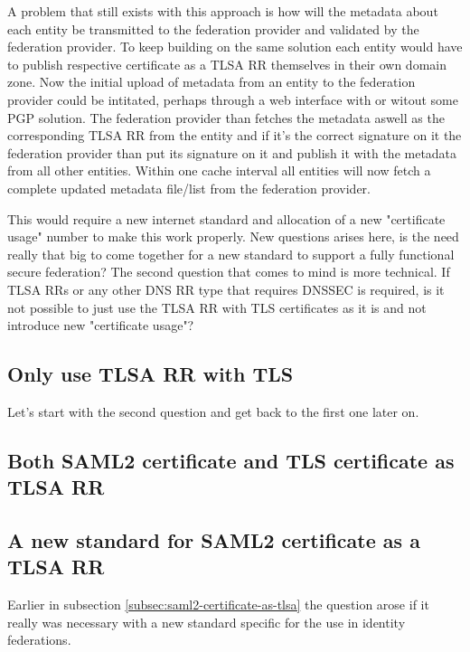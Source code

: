 A problem that still exists with this approach is how will the metadata about each entity be transmitted to the federation provider and validated by the federation provider.
To keep building on the same solution each entity would have to publish respective certificate as a TLSA RR themselves in their own domain zone.
Now the initial upload of metadata from an entity to the federation provider could be intitated, perhaps through a web interface with or witout some PGP solution.
The federation provider than fetches the metadata aswell as the corresponding TLSA RR from the entity and if it's the correct signature on it the federation provider than put its signature on it and publish it with the metadata from all other entities.
Within one cache interval all entities will now fetch a complete updated metadata file/list from the federation provider.


This would require a new internet standard and allocation of a new "certificate usage" number to make this work properly.
New questions arises here, is the need really that big to come together for a new standard to support a fully functional secure federation?
The second question that comes to mind is more technical.
If TLSA RRs or any other DNS RR type that requires DNSSEC is required, is it not possible to just use the TLSA RR with TLS certificates as it is and not introduce new "certificate usage"?

\subsection{Only use TLSA RR with TLS}
\label{subsec:only-tlsa-rr-with-tls}
Let's start with the second question and get back to the first one later on.

\subsection{Both SAML2 certificate and TLS certificate as TLSA RR}

\subsection{A new standard for SAML2 certificate as a TLSA RR}
Earlier in subsection \ref{subsec:saml2-certificate-as-tlsa} the question arose if it really was necessary with a new standard specific for the use in identity federations.

